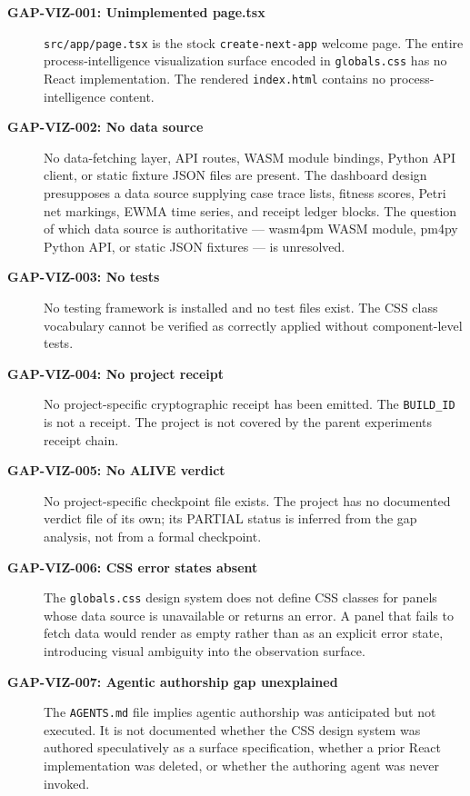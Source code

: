 \begin{description}
  \item[\textbf{GAP-VIZ-001: Unimplemented page.tsx}]
    \texttt{src/app/page.tsx} is the stock \texttt{create-next-app} welcome page. The
    entire process-intelligence visualization surface encoded in \texttt{globals.css} has
    no React implementation. The rendered \texttt{index.html} contains no
    process-intelligence content.

  \item[\textbf{GAP-VIZ-002: No data source}]
    No data-fetching layer, API routes, WASM module bindings, Python API client, or static
    fixture JSON files are present. The dashboard design presupposes a data source supplying
    case trace lists, fitness scores, Petri net markings, EWMA time series, and receipt
    ledger blocks. The question of which data source is authoritative --- wasm4pm WASM
    module, pm4py Python API, or static JSON fixtures --- is unresolved.

  \item[\textbf{GAP-VIZ-003: No tests}]
    No testing framework is installed and no test files exist. The CSS class vocabulary
    cannot be verified as correctly applied without component-level tests.

  \item[\textbf{GAP-VIZ-004: No project receipt}]
    No project-specific cryptographic receipt has been emitted. The \texttt{BUILD\_ID}
    is not a receipt. The project is not covered by the parent experiments receipt chain.

  \item[\textbf{GAP-VIZ-005: No ALIVE verdict}]
    No project-specific checkpoint file exists. The project has no documented verdict file
    of its own; its PARTIAL status is inferred from the gap analysis, not from a formal
    checkpoint.

  \item[\textbf{GAP-VIZ-006: CSS error states absent}]
    The \texttt{globals.css} design system does not define CSS classes for panels whose
    data source is unavailable or returns an error. A panel that fails to fetch data would
    render as empty rather than as an explicit error state, introducing visual ambiguity
    into the observation surface.

  \item[\textbf{GAP-VIZ-007: Agentic authorship gap unexplained}]
    The \texttt{AGENTS.md} file implies agentic authorship was anticipated but not executed.
    It is not documented whether the CSS design system was authored speculatively as a
    surface specification, whether a prior React implementation was deleted, or whether
    the authoring agent was never invoked.
\end{description}


